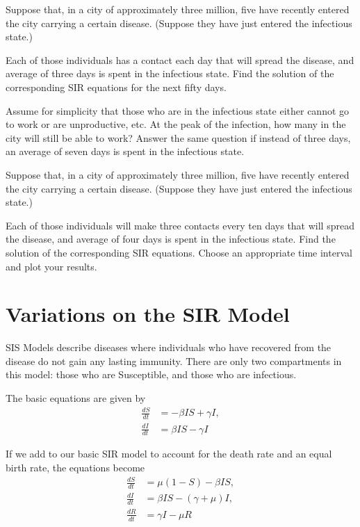 \begin{problem}
Suppose that, in a city of approximately three million, five have recently entered the city carrying a certain disease.
(Suppose they have just entered the infectious state.)

Each of those individuals has a contact each day that will spread the disease, and average of three days is spent in the infectious state.
Find the solution of the corresponding SIR equations for the next fifty days. 

Assume for simplicity that those who are in the infectious state either cannot go to work or are unproductive, etc.
At the peak of the infection, how many in the city will still be able to work? 
Answer the same question if instead of three days, an average of seven days is spent in the infectious state.
\end{problem}


\begin{problem}
Suppose that, in a city of approximately three million, five have recently entered the city carrying a certain disease.
(Suppose they have just entered the infectious state.) 

Each of those individuals will make three contacts every ten days that will spread the disease, and average of four days is spent in the infectious state.
Find the solution of the corresponding SIR equations.
Choose an appropriate time interval and plot your results.
\end{problem}

\section*{Variations on the SIR Model}

SIS Models describe diseases where individuals who have recovered from the disease do not gain 
any lasting immunity.
There are only two compartments in this model: those who are Susceptible, and those who are infectious.

The basic equations are given by
\begin{align*}
\frac{dS}{dt} &=-\beta I S + \gamma I ,\\
\frac{dI}{dt} &= \beta I S-\gamma I
\end{align*}

If we add to our basic SIR model to account for the death rate and an equal birth rate, the equations become
\begin{align*}
\frac{dS}{dt} &=\mu(1 -S) - \beta I S,\\
\frac{dI}{dt} &= \beta I S - (\gamma + \mu)I, \\
\frac{dR}{dt} &= \gamma I - \mu R
\end{align*}

